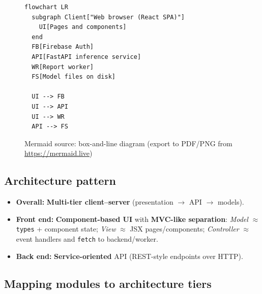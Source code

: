 \begin{figure}[htbp]
  \centering
  \begin{minipage}{0.92\textwidth}
  \begin{lstlisting}
flowchart LR
  subgraph Client["Web browser (React SPA)"]
    UI[Pages and components]
  end
  FB[Firebase Auth]
  API[FastAPI inference service]
  WR[Report worker]
  FS[Model files on disk]

  UI --> FB
  UI --> API
  UI --> WR
  API --> FS
  \end{lstlisting}
  \end{minipage}
  \caption{Mermaid source: box-and-line diagram (export to PDF/PNG from \url{https://mermaid.live})}
  \label{fig:box-line}
\end{figure}

\subsection{Architecture pattern}

\begin{itemize}
  \item \textbf{Overall:} \textbf{Multi-tier client--server} (presentation $\rightarrow$ API $\rightarrow$ models).
  \item \textbf{Front end:} \textbf{Component-based UI} with \textbf{MVC-like separation}: \emph{Model} $\approx$ \texttt{types} + component state; \emph{View} $\approx$ JSX pages/components; \emph{Controller} $\approx$ event handlers and \texttt{fetch} to backend/worker.
  \item \textbf{Back end:} \textbf{Service-oriented} API (REST-style endpoints over HTTP).
\end{itemize}

\subsection{Mapping modules to architecture tiers}

